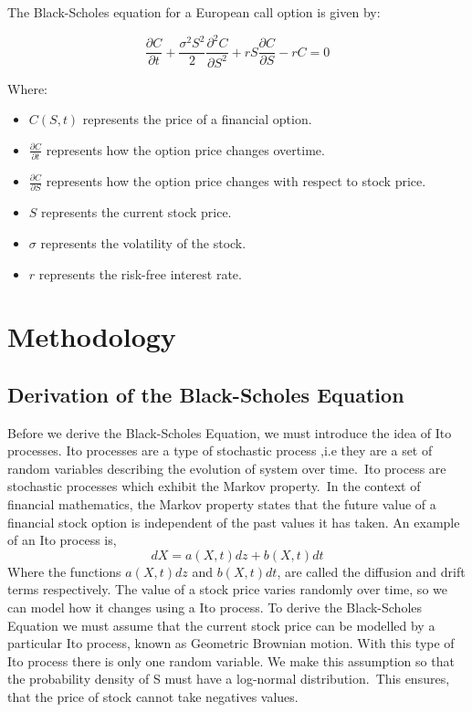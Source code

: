 \documentclass[11pt]{article}
\begin{document}
The Black-Scholes equation for a European call option is given by:

\[ \frac{\partial C}{\partial t} + \frac{\sigma^2S^2}{2} \frac{\partial^2 C}{\partial S^2} + rS \frac{\partial C}{\partial S} - rC = 0 \]

Where:
\begin{itemize}
    \item \(C(S, t)\) represents the price of a financial option.
    \item \(\frac{\partial C}{\partial t}\) represents how the option price changes overtime.
    \item \(\frac{\partial C}{\partial S}\) represents how the option price changes with respect to stock price.
    \item \(S\) represents the current stock price.
    \item \(\sigma\) represents the volatility of the stock.
    \item \(r\) represents the risk-free interest rate.
\end{itemize}

\newpage


\section{Methodology}

\subsection{Derivation of the Black-Scholes Equation}

Before we derive the Black-Scholes Equation, we must introduce the idea of Ito processes.
Ito processes are a type of stochastic process ,i.e they are a set of random variables describing the evolution of system over time.\ Ito process are stochastic processes which exhibit the Markov property.\ In the context of financial mathematics, the Markov property states that the future value of a financial stock option is independent of the past values it has taken. An example of an Ito process is,
\begin{equation*}
dX = a(X,t)dz + b(X,t)dt 
\end{equation*}
Where the functions $a(X,t)dz$ and $b(X,t)dt$, are called the diffusion and drift terms respectively. The value of a stock price varies randomly over time, so we can model how it changes using a Ito process. To derive the Black-Scholes Equation we must assume that the current stock price can be modelled by a particular Ito process, known as Geometric Brownian motion. With this type of Ito process there is only one random variable. We make this assumption so that the probability density of S must have a log-normal distribution.\ This ensures, that the price of stock cannot take negatives values.
\end{document}
